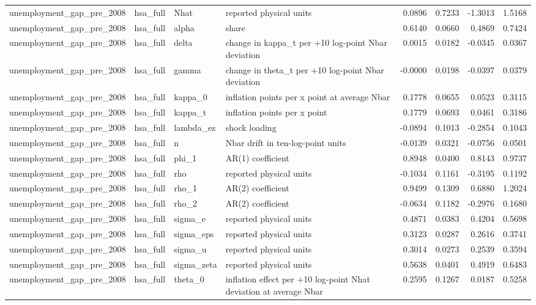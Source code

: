 \begin{tabular}{llllrrrr}
unemployment\_gap\_pre\_2008 & hsa\_full & Nhat & reported physical units & 0.0896 & 0.7233 & -1.3013 & 1.5168 \\
unemployment\_gap\_pre\_2008 & hsa\_full & alpha & share & 0.6140 & 0.0660 & 0.4869 & 0.7424 \\
unemployment\_gap\_pre\_2008 & hsa\_full & delta & change in kappa\_t per +10 log-point Nbar deviation & 0.0015 & 0.0182 & -0.0345 & 0.0367 \\
unemployment\_gap\_pre\_2008 & hsa\_full & gamma & change in theta\_t per +10 log-point Nbar deviation & -0.0000 & 0.0198 & -0.0397 & 0.0379 \\
unemployment\_gap\_pre\_2008 & hsa\_full & kappa\_0 & inflation points per x point at average Nbar & 0.1778 & 0.0655 & 0.0523 & 0.3115 \\
unemployment\_gap\_pre\_2008 & hsa\_full & kappa\_t & inflation points per x point & 0.1779 & 0.0693 & 0.0461 & 0.3186 \\
unemployment\_gap\_pre\_2008 & hsa\_full & lambda\_ez & shock loading & -0.0894 & 0.1013 & -0.2854 & 0.1043 \\
unemployment\_gap\_pre\_2008 & hsa\_full & n & Nbar drift in ten-log-point units & -0.0139 & 0.0321 & -0.0756 & 0.0501 \\
unemployment\_gap\_pre\_2008 & hsa\_full & phi\_1 & AR(1) coefficient & 0.8948 & 0.0400 & 0.8143 & 0.9737 \\
unemployment\_gap\_pre\_2008 & hsa\_full & rho & reported physical units & -0.1034 & 0.1161 & -0.3195 & 0.1192 \\
unemployment\_gap\_pre\_2008 & hsa\_full & rho\_1 & AR(2) coefficient & 0.9499 & 0.1309 & 0.6880 & 1.2024 \\
unemployment\_gap\_pre\_2008 & hsa\_full & rho\_2 & AR(2) coefficient & -0.0634 & 0.1182 & -0.2976 & 0.1680 \\
unemployment\_gap\_pre\_2008 & hsa\_full & sigma\_e & reported physical units & 0.4871 & 0.0383 & 0.4204 & 0.5698 \\
unemployment\_gap\_pre\_2008 & hsa\_full & sigma\_eps & reported physical units & 0.3123 & 0.0287 & 0.2616 & 0.3741 \\
unemployment\_gap\_pre\_2008 & hsa\_full & sigma\_u & reported physical units & 0.3014 & 0.0273 & 0.2539 & 0.3594 \\
unemployment\_gap\_pre\_2008 & hsa\_full & sigma\_zeta & reported physical units & 0.5638 & 0.0401 & 0.4919 & 0.6483 \\
unemployment\_gap\_pre\_2008 & hsa\_full & theta\_0 & inflation effect per +10 log-point Nhat deviation at average Nbar & 0.2595 & 0.1267 & 0.0187 & 0.5258 \\

\end{tabular}
